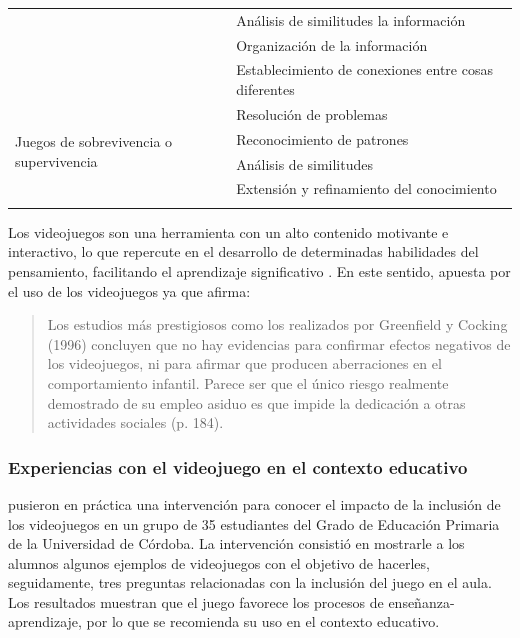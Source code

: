 \documentclass[spanish]{textolivre}
\begin{document}
\begin{table}[htbp]
\begin{tabular}{p{}p{}}
 & Análisis de similitudes la información\\ 
 & Organización de la información\\ 
 & Establecimiento de conexiones entre cosas diferentes \\ 
\midrule
\multirow{4}{=}{Juegos de sobrevivencia o supervivencia} & Resolución de problemas\\ 
 & Reconocimiento de patrones\\ 
 & Análisis de similitudes\\ 
 & Extensión y refinamiento del conocimiento \\ 
\arrayrulecolor{black}
\bottomrule
\end{tabular}
\end{table}

Los videojuegos son una herramienta con un alto contenido motivante e interactivo, lo que repercute en el desarrollo de determinadas habilidades del pensamiento, facilitando el aprendizaje significativo \cite{riveraarteaga2018}. %
En este sentido, \textcite{sedeno2010} %
apuesta por el uso de los videojuegos ya que afirma:

\begin{quote}
Los estudios más prestigiosos como los realizados por Greenfield y Cocking (1996) concluyen que no hay evidencias para confirmar efectos negativos de los videojuegos, ni para afirmar que producen aberraciones en el comportamiento infantil. Parece ser que el único riesgo realmente demostrado de su empleo asiduo es que impide la dedicación a otras actividades sociales (p. 184).
\end{quote}

\subsubsection{Experiencias con el videojuego en el contexto educativo}
\textcite{moralesdiaz2018} %
pusieron en práctica una intervención para conocer el impacto de la inclusión de los videojuegos en un grupo de 35 estudiantes del Grado de Educación Primaria de la Universidad de Córdoba.  La intervención consistió en mostrarle a los alumnos algunos ejemplos de videojuegos con el objetivo de hacerles, seguidamente, tres preguntas relacionadas con la inclusión del juego en el aula.  Los resultados muestran que el juego favorece los procesos de enseñanza-aprendizaje, por lo que se recomienda su uso en el contexto educativo.
\end{document}
